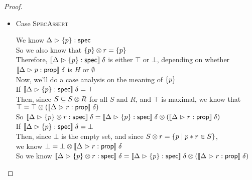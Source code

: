 \begin{proof}
\begin{itemize}
    \item Case \textsc{SpecAssert}
      \begin{tabbedproof}
        \oo We know ${\Delta} \vartriangleright {\{{p}\}} : \mathsf{spec}$ \\
        \oo So we also know that ${\{{p}\}} \otimes {r} = \{{p}\}$ \\
        \oo Therefore, $[\![{{\Delta} \vartriangleright {\{{p}\}} : \mathsf{spec}}]\!]\;\delta$ is either $\top$ or $\bot$, depending on
            whether $[\![{{\Delta} \vartriangleright {p} : {\mathsf{prop}}}]\!]\;\delta$ is $H$ or $\emptyset$ \\
        \oo Now, we'll do a case analysis on the meaning of $\{{p}\}$ \\
        \ooo If $[\![{{\Delta} \vartriangleright {\{{p}\}} : \mathsf{spec}}]\!]\;\delta = \top$ \\
        \oooo Then, since $S \subseteq {S} \otimes {R}$ for all $S$ and $R$, and $\top$ is maximal, we know that \\
        \oooox $\top = {\top} \otimes {([\![{{\Delta} \vartriangleright {r} : {\mathsf{prop}}}]\!]\;\delta)}$ \\
        \oooo So $[\![{{\Delta} \vartriangleright {{\{{p}\}} \otimes {r}} : \mathsf{spec}}]\!]\;\delta = {[\![{{\Delta} \vartriangleright {\{{p}\}} : \mathsf{spec}}]\!]\;\delta} \otimes {([\![{{\Delta} \vartriangleright {r} : {\mathsf{prop}}}]\!]\;\delta)}$ \\
        \ooo If $[\![{{\Delta} \vartriangleright {\{{p}\}} : \mathsf{spec}}]\!]\;\delta = \bot$ \\
        \oooo Then, since $\bot$ is the empty set, and since ${S} \otimes {r} = \{{{p}\;|\;{p * r \in S}}\}$, \\
        \ooooo we know $\bot = {\bot} \otimes {[\![{{\Delta} \vartriangleright {r} : {\mathsf{prop}}}]\!]\;\delta}$ \\
        \oooo  So we know $[\![{{\Delta} \vartriangleright {{\{{p}\}} \otimes {r}} : \mathsf{spec}}]\!]\;\delta = {[\![{{\Delta} \vartriangleright {\{{p}\}} : \mathsf{spec}}]\!]\;\delta} \otimes {([\![{{\Delta} \vartriangleright {r} : {\mathsf{prop}}}]\!]\;\delta)}$ \\
      \end{tabbedproof}


\end{itemize}
\end{proof}
